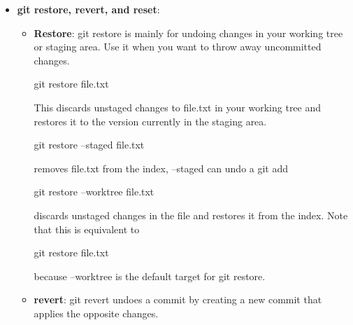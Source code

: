 \documentclass{report}
\begin{document}
\begin{itemize}
\begin{bashcode}
                git add --patch 
            \end{bashcode}
            \bigbreak \noindent 
            or
            \bigbreak \noindent 
            \begin{bashcode}
                git add -p
            \end{bashcode}
            \bigbreak \noindent 
            shows you each change hunk and asks whether you want to stage it. A hunk is a small contiguous block of changed lines. For example, if you edited two unrelated parts of the same file, Git may show them as two separate hunks.
        \item \textbf{git restore, revert, and reset}: 
            \begin{itemize}
                \item \textbf{Restore}: git restore is mainly for undoing changes in your working tree or staging area. Use it when you want to throw away uncommitted changes.
                    \bigbreak \noindent 
                    \begin{bashcode}
                        git restore file.txt
                    \end{bashcode}
                    \bigbreak \noindent 
                    This discards unstaged changes to file.txt in your working tree and restores it to the version currently in the staging area.
                    \bigbreak \noindent 
                    \begin{bashcode}
                        git restore --staged file.txt
                    \end{bashcode}
                    \bigbreak \noindent 
                    removes file.txt from the index, --staged can undo a git add
                    \bigbreak \noindent 
                    \begin{bashcode}
                        git restore --worktree file.txt
                    \end{bashcode}
                    \bigbreak \noindent 
                    discards unstaged changes in the file and restores it from the index. Note that this is equivalent to 
                    \bigbreak \noindent 
                    \begin{bashcode}
                        git restore file.txt
                    \end{bashcode}
                    \bigbreak \noindent 
                    because --worktree is the default target for git restore.
                \item \textbf{revert}: git revert undoes a commit by creating a new commit that applies the opposite changes.

\end{itemize}
\end{itemize}
\end{document}
